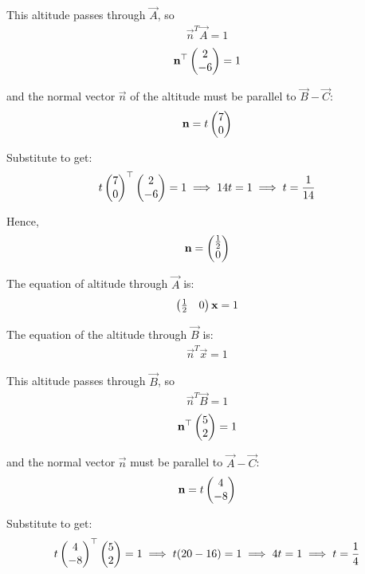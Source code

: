 \documentclass[journal]{IEEEtran}
\begin{document}
This altitude passes through \( \vec{A} \), so
\begin{align}
\vec{n}^T \vec{A} = 1
\end{align}
\begin{align}
\mathbf{n}^\top \begin{pmatrix}2 \\ -6\end{pmatrix} = 1
\end{align}

and the normal vector \( \vec{n} \) of the altitude must be parallel to \( \vec{B} - \vec{C} \):
\begin{align}
\mathbf{n} = t \begin{pmatrix}7 \\ 0\end{pmatrix}
\end{align}

Substitute to get:
\begin{align}
t \begin{pmatrix}7 \\ 0\end{pmatrix}^\top \begin{pmatrix}2 \\ -6\end{pmatrix} = 1 \implies 14 t = 1 \implies t = \frac{1}{14}
\end{align}

Hence,
\begin{align}
\mathbf{n} = \begin{pmatrix}\frac{1}{2} \\ 0\end{pmatrix}
\end{align}

The equation of altitude through \( \vec{A} \) is:
\begin{align}
\begin{pmatrix}\frac{1}{2} & 0\end{pmatrix} \mathbf{x} = 1
\end{align}

\vspace{1em}

The equation of the altitude through \( \vec{B} \) is:
\begin{align}
\vec{n}^T \vec{x} = 1
\end{align}

This altitude passes through \( \vec{B} \), so
\begin{align}
\vec{n}^T \vec{B} = 1
\end{align}
\begin{align}
\mathbf{n}^\top \begin{pmatrix}5 \\ 2\end{pmatrix} = 1
\end{align}

and the normal vector \( \vec{n} \) must be parallel to \( \vec{A} - \vec{C} \):
\begin{align}
\mathbf{n} = t \begin{pmatrix}4 \\ -8\end{pmatrix}
\end{align}

Substitute to get:
\begin{align}
t \begin{pmatrix}4 \\ -8\end{pmatrix}^\top \begin{pmatrix}5 \\ 2\end{pmatrix} = 1 \implies t (20 - 16) = 1 \implies 4 t = 1 \implies t = \frac{1}{4}
\end{align}
\end{document}
